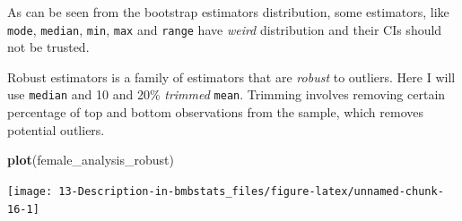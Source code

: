 \documentclass[
]{book}
\newenvironment{Shaded}{\begin{snugshade}}{\end{snugshade}}
\newcommand{\CommentTok}[1]{\textcolor[rgb]{0.56,0.35,0.01}{\textit{#1}}}
\newcommand{\DataTypeTok}[1]{\textcolor[rgb]{0.13,0.29,0.53}{#1}}
\newcommand{\DecValTok}[1]{\textcolor[rgb]{0.00,0.00,0.81}{#1}}
\newcommand{\FloatTok}[1]{\textcolor[rgb]{0.00,0.00,0.81}{#1}}
\newcommand{\KeywordTok}[1]{\textcolor[rgb]{0.13,0.29,0.53}{\textbf{#1}}}
\newcommand{\NormalTok}[1]{#1}
\newcommand{\OperatorTok}[1]{\textcolor[rgb]{0.81,0.36,0.00}{\textbf{#1}}}
\newcommand{\StringTok}[1]{\textcolor[rgb]{0.31,0.60,0.02}{#1}}
\begin{document}
As can be seen from the bootstrap estimators distribution, some estimators, like \texttt{mode}, \texttt{median}, \texttt{min}, \texttt{max} and \texttt{range} have \emph{weird} distribution and their CIs should not be trusted.

Robust estimators is a family of estimators that are \emph{robust} to outliers. Here I will use \texttt{median} and 10 and 20\% \emph{trimmed} \texttt{mean}. Trimming involves removing certain percentage of top and bottom observations from the sample, which removes potential outliers.

\begin{Shaded}
\end{Shaded}

\begin{Shaded}
\begin{Highlighting}[]
\KeywordTok{plot}\NormalTok{(female\_analysis\_robust)}
\end{Highlighting}
\end{Shaded}

\begin{center}\texttt{[image: 13-Description-in-bmbstats\_files/figure-latex/unnamed-chunk-16-1]} \end{center}
\end{document}
